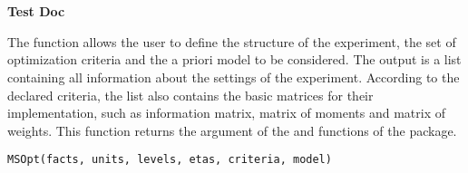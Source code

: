 \documentclass[a4paper]{book}
\begin{document}
\chapter*{}
\begin{center}
{\textbf{\huge Test Doc}}
\par\bigskip{\large \today}
\end{center}
%
\begin{Description}\relax
The  function allows the user to define the
structure of the experiment, the set of optimization criteria and the a priori
model to be considered. The output is a list containing all information about
the settings of the experiment. According to the declared criteria, the list
also contains the basic matrices for their implementation, such as
information matrix, matrix of moments and matrix of weights. This function
returns the  argument of the  and
 functions of the  package.
\end{Description}
%
\begin{Usage}
\begin{verbatim}
MSOpt(facts, units, levels, etas, criteria, model)
\end{verbatim}
\end{Usage}
%
\end{document}
